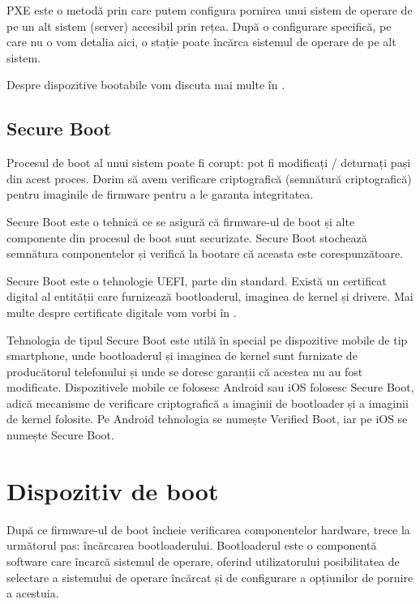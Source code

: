 PXE este o metodă prin care putem configura pornirea unui sistem de operare de pe un alt sistem (server) accesibil prin rețea.
După o configurare specifică, pe care nu o vom detalia aici, o stație poate încărca sistemul de operare de pe alt sistem.

Despre dispozitive bootabile vom discuta mai multe în .

\subsection{Secure Boot}
\label{sec:boot:secure-boot}

Procesul de boot al unui sistem poate fi corupt: pot fi modificați / deturnați pași din acest proces.
Dorim să avem verificare criptografică (semnătură criptografică) pentru imaginile de firmware pentru a le garanta integritatea.

Secure Boot este o tehnică ce se asigură că firmware-ul de boot și alte componente din procesul de boot sunt securizate.
Secure Boot stochează semnătura componentelor și verifică la bootare că aceasta este corespunzătoare.

Secure Boot este o tehnologie UEFI, parte din standard.
Există un certificat digital al entității care furnizează bootloaderul, imaginea de kernel și drivere.
Mai multe despre certificate digitale vom vorbi în .

Tehnologia de tipul Secure Boot este utilă în special pe dispozitive mobile de tip smartphone, unde bootloaderul și imaginea de kernel sunt furnizate de producătorul telefonului și unde se doresc garanții că acestea nu au fost modificate.
 Dispozitivele mobile ce folosesc Android sau iOS folosesc Secure Boot, adică mecanisme de verificare criptografică a imaginii de bootloader și a imaginii de kernel folosite.
Pe Android tehnologia se numește Verified Boot, iar pe iOS se numește Secure Boot.

\section{Dispozitiv de boot}
\label{sec:boot:bootdev}

După ce firmware-ul de boot încheie verificarea componentelor hardware, trece la următorul pas: încărcarea bootloaderului.
Bootloaderul este o componentă software care încarcă sistemul de operare, oferind utilizatorului posibilitatea de selectare a sistemului de operare încărcat și de configurare a opțiunilor de pornire a acestuia.

